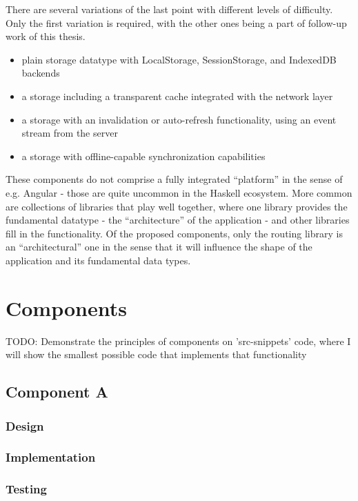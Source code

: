 \documentclass[english,odsaz]{fitthesis}
\begin{document}
There are several variations of the last point with different levels of
difficulty. Only the first variation is required, with the other ones being a
part of follow-up work of this thesis.
\begin{itemize}
\item plain storage datatype with LocalStorage, SessionStorage, and IndexedDB backends
\item a storage including a transparent cache integrated with the network layer
\item a storage with an invalidation or auto-refresh functionality, using an event
stream from the server
\item a storage with offline-capable synchronization capabilities
\end{itemize}

These components do not comprise a fully integrated ``platform'' in the sense of
e.g. Angular - those are quite uncommon in the Haskell ecosystem. More common
are collections of libraries that play well together, where one library provides
the fundamental datatype - the ``architecture'' of the application - and other
libraries fill in the functionality. Of the proposed components, only the
routing library is an ``architectural'' one in the sense that it will influence
the shape of the application and its fundamental data types.

\chapter{Components}
\label{sec:org17cd252}
TODO: Demonstrate the principles of components on 'src-snippets' code, where
I will show the smallest possible code that implements that functionality

\section{Component A}
\label{sec:orgac277a3}
\subsection{Design}
\label{sec:org0cae949}
\subsection{Implementation}
\label{sec:org2a32efc}
\subsection{Testing}
\label{sec:orgfbf0de7}
\end{document}
